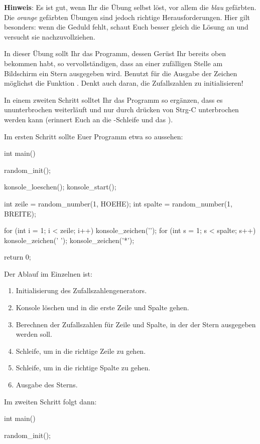 \textbf{Hinweis}: Es ist gut, wenn Ihr die Übung selbst löst, vor allem die \emph{blau} gefärbten. Die \emph{orange} gefärbten Übungen sind jedoch richtige Herausforderungen. Hier gilt besonders: wenn die Geduld fehlt, schaut Euch besser gleich die Lösung an und versucht sie nachzuvollziehen. 

\begin{challenge}
    In dieser Übung sollt Ihr das Programm, dessen Gerüst Ihr bereits oben bekommen habt, so vervollständigen, dass an einer zufälligen Stelle am Bildschirm ein Stern ausgegeben wird. Benutzt für die Ausgabe der Zeichen möglichst die Funktion . Denkt auch daran, die Zufallszahlen zu initialisieren!

    In einem zweiten Schritt solltet Ihr das Programm so ergänzen, dass es ununterbrochen weiterläuft und nur durch drücken von Strg-C unterbrochen werden kann (erinnert Euch an die -Schleife und das ). 
    \begin{solution}
        Im ersten Schritt sollte Euer Programm etwa so aussehen:

\begin{code}
int main() {
    random_init();

    konsole_loeschen();
    konsole_start();

    int zeile = random_number(1, HOEHE);
    int spalte = random_number(1, BREITE);

    for (int i = 1; i < zeile; i++) {
        konsole_zeichen('\n');
    }
    for (int s = 1; s < spalte; s++) {
        konsole_zeichen(' ');
    }
    konsole_zeichen('*');

    return 0;
}
\end{code}
    Der Ablauf im Einzelnen ist:
    \begin{enumerate}
    \item Initialisierung des Zufallszahlengenerators.
    \item Konsole löschen und in die erste Zeile und Spalte gehen.
    \item Berechnen der Zufallszahlen für Zeile und Spalte, in der der Stern ausgegeben werden soll.
    \item Schleife, um in die richtige Zeile zu gehen.
    \item Schleife, um in die richtige Spalte zu gehen.
    \item Ausgabe des Sterns.
    \end{enumerate}

    \noindent
    Im zweiten Schritt folgt dann:
\begin{code}
int main() {
    random_init();

}
\end{code}
\end{solution}
\end{challenge}
